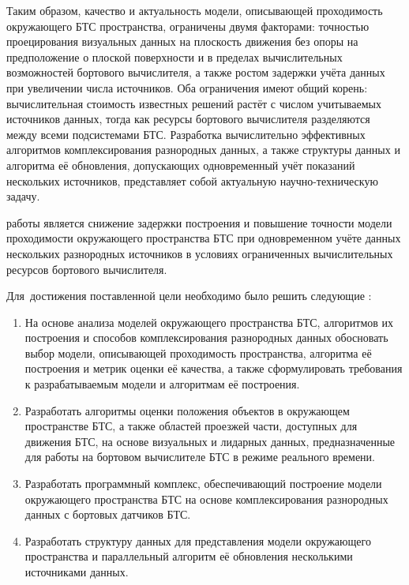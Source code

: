 Таким образом, качество и актуальность модели, описывающей проходимость окружающего БТС пространства, ограничены двумя факторами: точностью проецирования визуальных данных на плоскость движения без опоры на предположение о плоской поверхности и в пределах вычислительных возможностей бортового вычислителя, а также ростом задержки учёта данных при увеличении числа источников. Оба ограничения имеют общий корень: вычислительная стоимость известных решений растёт с числом учитываемых источников данных, тогда как ресурсы бортового вычислителя разделяются между всеми подсистемами БТС. Разработка вычислительно эффективных алгоритмов комплексирования разнородных данных, а также структуры данных и алгоритма её обновления, допускающих одновременный учёт показаний нескольких источников, представляет собой актуальную научно-техническую задачу.

{\aim} работы является снижение задержки построения и повышение точности модели проходимости окружающего пространства БТС при одновременном учёте данных нескольких разнородных источников в условиях ограниченных вычислительных ресурсов бортового вычислителя.

Для~достижения поставленной цели необходимо было решить следующие {\tasks}:
\begin{enumerate}[beginpenalty=10000] %
  \item На основе анализа моделей окружающего пространства БТС, алгоритмов их построения и способов комплексирования разнородных данных обосновать выбор модели, описывающей проходимость пространства, алгоритма её построения и метрик оценки её качества, а также сформулировать требования к разрабатываемым модели и алгоритмам её построения.
  \item Разработать алгоритмы оценки положения объектов в окружающем пространстве БТС, а также областей проезжей части, доступных для движения БТС, на основе визуальных и лидарных данных, предназначенные для работы на бортовом вычислителе БТС в режиме реального времени.
  \item Разработать программный комплекс, обеспечивающий построение модели окружающего пространства БТС на основе комплексирования разнородных данных с бортовых датчиков БТС.
  \item Разработать структуру данных для представления модели окружающего пространства и параллельный алгоритм её обновления несколькими источниками данных.
\end{enumerate}


